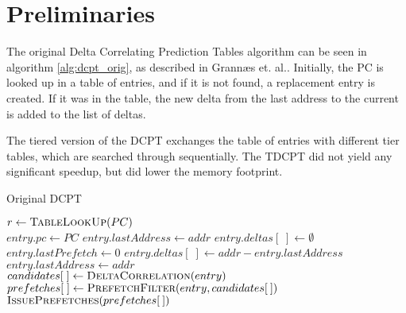 \section{Preliminaries}

The original Delta Correlating Prediction Tables algorithm can be seen in
algorithm \ref{alg:dcpt_orig}, as described in Grannæs et.
al.\cite{Grannaes481837}. Initially, the PC is looked up in a table of entries,
and if it is not found, a replacement entry is created. If it was in the table,
the new delta from the last address to the current is added to the list of
deltas. 

The tiered version of the DCPT exchanges the table of entries with different
tier tables, which are searched through sequentially. The TDCPT did not yield
any significant speedup, but did lower the memory footprint.

\begin{algorithm}
\footnotesize
\caption{Original DCPT \cite{Grannaes481837}}
  \begin{algorithmic}[1]
      \State $r \gets \Call{TableLookUp}{PC}$ \\

        \State $entry.pc \gets PC$
        \State $entry.lastAddress \gets addr$
        \State $entry.deltas[\;] \gets \emptyset$
        \State $entry.lastPrefetch \gets 0$
        \State $entry.deltas[\;] \gets addr - entry.lastAddress$
        \State $entry.lastAddress \gets addr$ \\

        \State $candidates[\;] \gets \Call{DeltaCorrelation}{entry}$
        \State $prefetches[\;] \gets \Call{PrefetchFilter}{entry, candidates[\:]}$
        \State $\Call{IssuePrefetches}{prefetches[\:]}$
      \EndIf
    \EndProcedure
  \end{algorithmic}
  \label{alg:dcpt_orig}
\end{algorithm}

